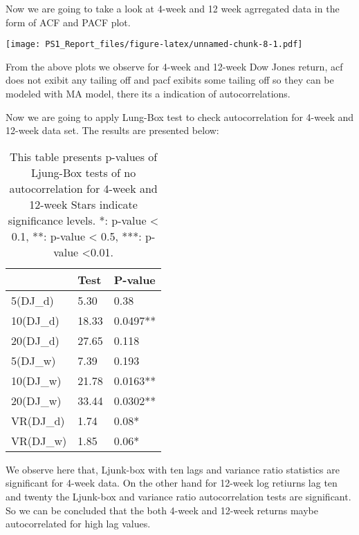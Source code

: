 \documentclass[
]{article}
\begin{document}
Now we are going to take a look at 4-week and 12 week agrregated data in
the form of ACF and PACF plot.

\texttt{[image: PS1\_Report\_files/figure-latex/unnamed-chunk-8-1.pdf]}

From the above plots we observe for 4-week and 12-week Dow Jones return,
acf does not exibit any tailing off and pacf exibits some tailing off so
they can be modeled with MA model, there its a indication of
autocorrelations.

Now we are going to apply Lung-Box test to check autocorrelation for
4-week and 12-week data set. The results are presented below:

\begin{table}

\caption{\label{tab:unnamed-chunk-9}This table presents p-values of Ljung-Box tests of no autocorrelation for 4-week and 12-week Stars indicate significance levels. *: p-value < 0.1, **: p-value < 0.5, ***: p-value <0.01.}
\centering
\begin{tabular}[t]{l|l|l}
\hline
  & Test & P-value\\
\hline
5(DJ\_d) & 5.30 & 0.38\\
\hline
10(DJ\_d) & 18.33 & 0.0497**\\
\hline
20(DJ\_d) & 27.65 & 0.118\\
\hline
5(DJ\_w) & 7.39 & 0.193\\
\hline
10(DJ\_w) & 21.78 & 0.0163**\\
\hline
20(DJ\_w) & 33.44 & 0.0302**\\
\hline
VR(DJ\_d) & 1.74 & 0.08*\\
\hline
VR(DJ\_w) & 1.85 & 0.06*\\
\hline
\end{tabular}
\end{table}

We observe here that, Ljunk-box with ten lags and variance ratio
statistics are significant for 4-week data. On the other hand for
12-week log retiurns lag ten and twenty the Ljunk-box and variance ratio
autocorrelation tests are significant. So we can be concluded that the
both 4-week and 12-week returns maybe autocorrelated for high lag
values.
\end{document}
